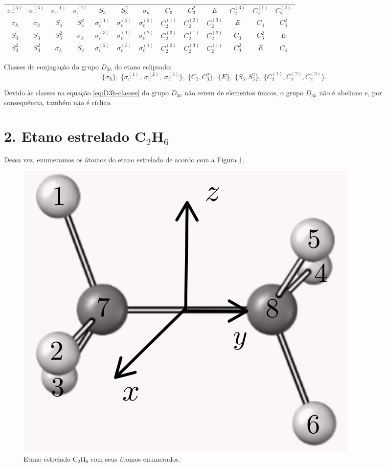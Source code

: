 \documentclass[a4paper,10pt]{article}
\begin{document}
\begin{table}[ht]
\begin{tabular} { |c|c c c c c c c c c c c c | }
$\sigma_v^{(3)}$ & $\sigma_v^{(3)}$ & $\sigma_v^{(1)}$ & $\sigma_v^{(2)}$ & $S_3$ & $S_3^2$ & $\sigma_h$ & $C_3$ & $C_3^2$ & $E$ & $C_2^{(3)}$ & $C_2^{(1)}$ & $C_2^{(2)}$ \\
$\sigma_h$ & $\sigma_h$ & $S_3$ & $S_3^2$ & $\sigma_v^{(1)}$ & $\sigma_v^{(2)}$ & $\sigma_v^{(3)}$ & $C_2^{(1)}$ & $C_2^{(2)}$ & $C_2^{(3)}$ & $E$ & $C_3$ & $C_3^2$ \\
$S_3$ & $S_3$ & $S_3^2$ & $\sigma_h$ & $\sigma_v^{(3)}$ & $\sigma_v^{(1)}$ & $\sigma_v^{(2)}$ & $C_2^{(3)}$ & $C_2^{(1)}$ & $C_2^{(2)}$ & $C_3$ & $C_3^2$ & $E$ \\
$S_3^2$ & $S_3^2$ & $\sigma_h$ & $S_3$ & $\sigma_v^{(2)}$ & $\sigma_v^{(3)}$ & $\sigma_v^{(1)}$ & $C_2^{(2)}$ & $C_2^{(3)}$ & $C_2^{(1)}$ & $C_3^2$ & $E$ & $C_3$ \\
\hline
\end{tabular}

\label{tab:mult_D3h}
\end{table}

Classes de conjugação do grupo $D_{3h}$ do etano eclipsado:
\begin{equation} \label{eq:D3h-classes}
\boxed{
\{ \sigma_h \}, \;
\{ \sigma_v^{(1)}, \;
\sigma_v^{(2)}, \;
\sigma_v^{(3)} \}, \;
\{ C_3, C_3^2 \}, \;
\{ E \}, \;
\{ S_3, S_3^2 \}, \;
\{ C_2^{(1)}, C_2^{(2)}, C_2^{(3)} \}.
}
\end{equation}

Devido às classes na equação \ref{eq:D3h-classes} do grupo $D_{3h}$ não serem de elementos únicos, o grupo $D_{3h}$ não é abeliano e, por consequência, também não é cíclico.


\pagebreak


\section*{2. Etano estrelado C$_2$H$_6$}

Dessa vez, enumeramos os átomos do etano estrelado de acordo com a Figura \ref{fig:etano_estrelado}.

\begin{figure}[H]
\centering
\includegraphics[width=0.3\linewidth]{fig/etano_estrelado.png}
\caption{Etano estrelado C$_2$H$_6$ com seus átomos enumerados.}
\label{fig:etano_estrelado}
\end{figure}
\end{document}
